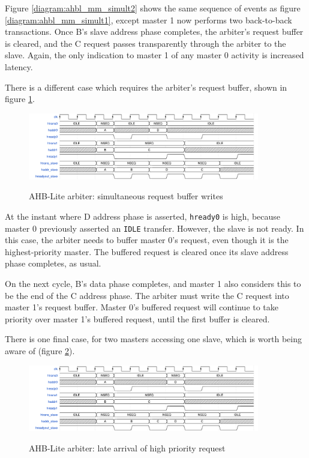 \documentclass[notitlepage]{article}
\begin{document}
Figure \ref{diagram:ahbl_mm_simult2} shows the same sequence of events as figure \ref{diagram:ahbl_mm_simult1}, except master 1 now performs two back-to-back transactions. Once B's slave address phase completes, the arbiter's request buffer is cleared, and the C request passes transparently through the arbiter to the slave. Again, the only indication to master 1 of any master 0 activity is increased latency.

There is a different case which requires the arbiter's request buffer, shown in figure \ref{diagram:ahbl_mm_simult3}.

\begin{figure}[H]
\centering
\caption{AHB-Lite arbiter: simultaneous request buffer writes}
\includegraphics[width=0.9\textwidth]{waves/ahbl_mm_simult3.pdf}
\label{diagram:ahbl_mm_simult3}
\end{figure}

At the instant where D address phase is asserted, \texttt{hready0} is high, because master 0 previously asserted an \texttt{IDLE} transfer. However, the slave is not ready. In this case, the arbiter needs to buffer master 0's request, even though it is the highest-priority master. The buffered request is cleared once its slave address phase completes, as usual.

On the next cycle, B's data phase completes, and master 1 also considers this to be the end of the C address phase. The arbiter must write the C request into master 1's request buffer. Master 0's buffered request will continue to take priority over master 1's buffered request, until the first buffer is cleared.

There is one final case, for two masters accessing one slave, which is worth being aware of (figure \ref{diagram:ahbl_mm_latearrival}).

\begin{figure}[H]
\centering
\caption{AHB-Lite arbiter: late arrival of high priority request}
\includegraphics[width=0.9\textwidth]{waves/ahbl_mm_latearrival.pdf}
\label{diagram:ahbl_mm_latearrival}
\end{figure}
\end{document}
